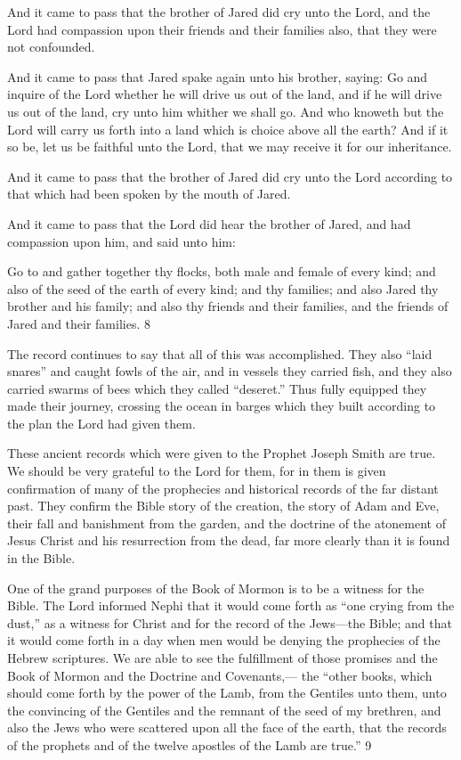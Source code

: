 And it came to pass that the brother of Jared did cry unto the Lord, and the Lord had
compassion upon their friends and their families also, that they were not confounded.

And it came to pass that Jared spake again unto his brother, saying: Go and inquire of the
Lord whether he will drive us out of the land, and if he will drive us out of the land, cry unto
him whither we shall go. And who knoweth but the Lord will carry us forth into a land which
is choice above all the earth? And if it so be, let us be faithful unto the Lord, that we may
receive it for our inheritance.

And it came to pass that the brother of Jared did cry unto the Lord according to that which
had been spoken by the mouth of Jared.

And it came to pass that the Lord did hear the brother of Jared, and had compassion upon
him, and said unto him:

Go to and gather together thy flocks, both male and female of every kind; and also of the
seed of the earth of every kind; and thy families; and also Jared thy brother and his family;
and also thy friends and their families, and the friends of Jared and their families. 8

The record continues to say that all of this was accomplished. They also ``laid snares'' and
caught fowls of the air, and in vessels they carried fish, and they also carried swarms of bees
which they called ``deseret.'' Thus fully equipped they made their journey, crossing the ocean
in barges which they built according to the plan the Lord had given them.

These ancient records which were given to the Prophet Joseph Smith are true. We should be
very grateful to the Lord for them, for in them is given confirmation of many of the
prophecies and historical records of the far distant past. They confirm the Bible story of the
creation, the story of Adam and Eve, their fall and banishment from the garden, and the
doctrine of the atonement of Jesus Christ and his resurrection from the dead, far more clearly
than it is found in the Bible.

One of the grand purposes of the Book of Mormon is to be a witness for the Bible. The Lord
informed Nephi that it would come forth as ``one crying from the dust,'' as a witness for
Christ and for the record of the Jews—the Bible; and that it would come forth in a day when
men would be denying the prophecies of the Hebrew scriptures. We are able to see the
fulfillment of those promises and the Book of Mormon and the Doctrine and Covenants,—
the ``other books, which should come forth by the power of the Lamb, from the Gentiles unto
them, unto the convincing of the Gentiles and the remnant of the seed of my brethren, and
also the Jews who were scattered upon all the face of the earth, that the records of the
prophets and of the twelve apostles of the Lamb are true.'' 9

